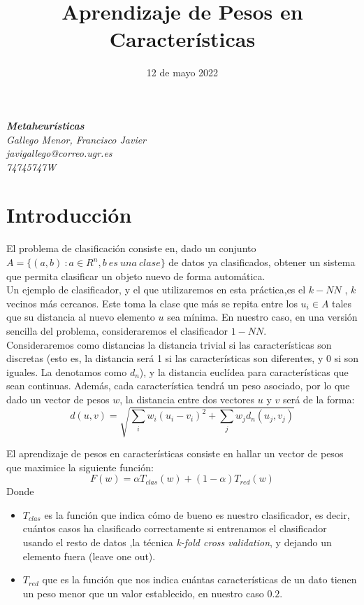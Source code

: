 \documentclass[10pt, a4paper]{article}
\title{\vspace{3cm}\textcolor{ugrColor}{\textbf{{{{\Huge Aprendizaje de Pesos en Características}}}}}}
\date{12 de mayo 2022}
\theoremstyle{theorem-style}
\theoremstyle{theorem-style}
\theoremstyle{theorem2-style}
\theoremstyle{definition-style}
\theoremstyle{remark-style}
\theoremstyle{example-style}
\theoremstyle{definition-style}
\theoremstyle{remark-style}
\theoremstyle{remark-style}
\begin{document}
\maketitle

\begin{center}
\large
\vspace{2cm}
\textbf{\emph{\Large Metaheurísticas}}\\
\emph{\large Gallego Menor, Francisco Javier}\\
\emph{\large javigallego@correo.ugr.es}\\
\emph{\large 74745747W}\\

\end{center}
              
\newpage


\tableofcontents
\newpage

\section{Introducción}
El problema de clasificación consiste en, dado un conjunto $A=\{(a,b) \ : a \in R^n, b \ es \ una \ clase\}$ de datos ya clasificados, obtener un sistema que permita clasificar un objeto nuevo de forma automática.\\

 Un ejemplo de clasificador, y el que utilizaremos en esta práctica,es el $k-NN$ , $k$ vecinos más cercanos. Este toma la clase que más se repita entre los $u_i\in A$ tales que su distancia al nuevo elemento $u$ sea mínima. En nuestro caso, en una versión sencilla del problema, consideraremos el clasificador $1-NN$. \\

Consideraremos como distancias la distancia trivial si las características son discretas (esto es, la distancia será 1 si las características son diferentes, y 0 si son iguales. La denotamos como $d_n$), y la distancia euclídea para características que sean continuas. Además, cada característica tendrá un peso asociado, por lo que dado un vector de pesos $w$, la distancia entre dos vectores $u$ y $v$ será de la forma:
\[
d(u,v) = \sqrt {\sum_i w_i(u_i- v_i)^2 + \sum_j w_j d_n(u_j,v_j)}
\]

 El aprendizaje de pesos en características consiste  en hallar un vector de pesos que maximice la siguiente función:
\[
F(w) = \alpha T_{clas}(w) + (1-\alpha)T_{red}(w)
\]
Donde
\begin{itemize}
\item $T_{clas}$ es la función que indica cómo de bueno es nuestro clasificador, es decir, cuántos casos ha clasificado correctamente si entrenamos el clasificador usando el resto de datos ,la técnica \emph{k-fold cross validation}, y dejando un elemento fuera (leave one out).
	\item $T_{red}$ que es la función que nos indica cuántas características de un dato tienen un peso menor que un valor establecido, en nuestro caso $0.2$.
\end{itemize}
\end{document}
